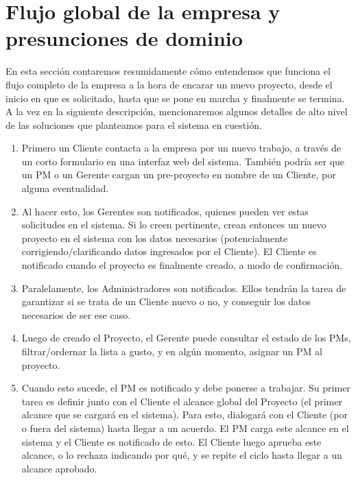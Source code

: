 \section{Flujo global de la empresa y presunciones de dominio}

En esta sección contaremos resumidamente cómo entendemos que funciona 
el flujo completo de la empresa a la hora de encarar un nuevo proyecto, 
desde el inicio en que es solicitado, hasta que se pone en marcha y finalmente 
se termina. A la vez en la siguiente descripción, mencionaremos algunos detalles 
de alto nivel de las soluciones que planteamos para el sistema en cuestión. 

\begin{enumerate}
    \item Primero un Cliente contacta a la empresa por un nuevo trabajo, 
    a través de un corto formulario en una interfaz web del sistema. 
    También podría ser que un PM o un Gerente cargan un pre-proyecto en nombre 
    de un Cliente, por alguna eventualidad. 
    
    \item Al hacer esto, los Gerentes son notificados, quienes pueden ver 
    estas solicitudes en el sistema. Si lo creen pertinente, crean entonces 
    un nuevo proyecto en el sistema con los datos necesarios (potencialmente 
    corrigiendo/clarificando datos ingresados por el Cliente). El Cliente 
    es notificado cuando el proyecto es finalmente creado, a modo de confirmación. 
    
    \item Paralelamente, los Administradores son notificados. Ellos tendrán la 
    tarea de garantizar si se trata de un Cliente nuevo o no, y conseguir los 
    datos necesarios de ser ese caso. 
    
    \item Luego de creado el Proyecto, el Gerente puede consultar el estado 
    de los PMs, filtrar/ordernar la lista a gusto, y en algún momento, 
    asignar un PM al proyecto. 
    
    \item Cuando esto sucede, el PM es notificado y debe ponerse a trabajar. 
    Su primer tarea es definir junto con el Cliente el alcance global del Proyecto 
    (el primer alcance que se cargará en el sistema). Para esto, 
    dialogará con el Cliente (por o fuera del sistema) hasta llegar a un acuerdo. 
    El PM carga este alcance en el sistema y el Cliente es notificado de esto. 
    El Cliente luego aprueba este alcance, o lo rechaza indicando por qué, y 
    se repite el ciclo hasta llegar a un alcance aprobado. 
    

\end{enumerate}
